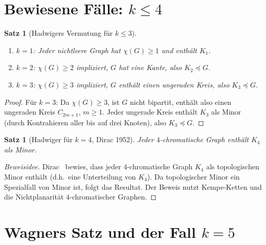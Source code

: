 \documentclass[12pt,a4paper]{amsart}
\newtheorem{satz}[theorem]{Satz}
\theoremstyle{definition}
\theoremstyle{remark}
\begin{document}
\section{Bewiesene Fälle: \texorpdfstring{$k \leq 4$}{k <= 4}}

\begin{satz}[Hadwigers Vermutung für $k \leq 3$]\label{satz:k3}
\begin{enumerate}[label=(\roman*)]
  \item $k = 1$: Jeder nichtleere Graph hat $\chi(G) \geq 1$ und enthält $K_1$.
  \item $k = 2$: $\chi(G) \geq 2$ impliziert, $G$ hat eine Kante, also $K_2 \preceq G$.
  \item $k = 3$: $\chi(G) \geq 3$ impliziert, $G$ enthält einen ungeraden Kreis, also $K_3 \preceq G$.
\end{enumerate}
\end{satz}

\begin{proof}
Für $k = 3$: Da $\chi(G) \geq 3$, ist $G$ nicht bipartit, enthält also einen ungeraden
Kreis $C_{2m+1}$, $m \geq 1$. Jeder ungerade Kreis enthält $K_3$ als Minor
(durch Kontrahieren aller bis auf drei Knoten), also $K_3 \preceq G$.
\end{proof}

\begin{satz}[Hadwiger für $k = 4$, Dirac 1952]\label{satz:k4}
Jeder $4$-chromatische Graph enthält $K_4$ als Minor.
\end{satz}

\begin{proof}[Beweisidee]
Dirac~\cite{Dirac52} bewies, dass jeder $4$-chromatische Graph $K_4$ als topologischen
Minor enthält (d.h.\ eine Unterteilung von $K_4$). Da topologischer Minor ein Spezialfall
von Minor ist, folgt das Resultat. Der Beweis nutzt Kempe-Ketten und die Nichtplanarität
$4$-chromatischer Graphen.
\end{proof}

\section{Wagners Satz und der Fall \texorpdfstring{$k = 5$}{k=5}}
\end{document}
